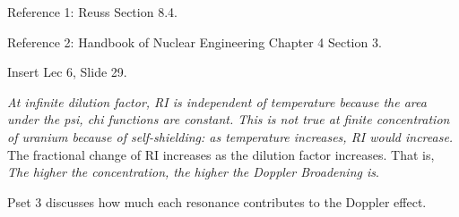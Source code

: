 \documentclass{school-22.211-notes}
\begin{document}
Reference 1: Reuss Section 8.4. 

Reference 2: Handbook of Nuclear Engineering Chapter 4 Section 3. 


Insert Lec 6, Slide 29. 

\textit{At infinite dilution factor, RI is independent of temperature because the area under the psi, chi functions are constant. This is not true at finite concentration of uranium because of self-shielding: as temperature increases, RI would increase.} The fractional change of RI increases as the dilution factor increases. That is, \textit{The higher the concentration, the higher the Doppler Broadening is}. 

Pset 3 discusses how much each resonance contributes to the Doppler effect. 
\end{document}
